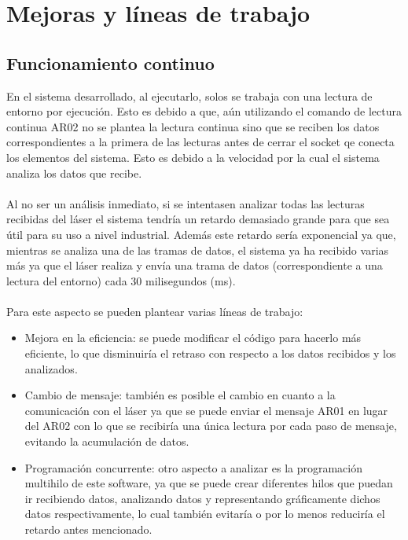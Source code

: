 \section{Mejoras y líneas de trabajo}

\subsection{Funcionamiento continuo}
En el sistema desarrollado, al ejecutarlo, solos se trabaja con una lectura de entorno por ejecución. Esto es debido a que, aún utilizando el comando de lectura continua AR02 no se plantea la lectura continua sino que se reciben los datos correspondientes a la primera de las lecturas antes de cerrar el socket qe conecta los elementos del sistema. Esto es debido a la velocidad por la cual el sistema analiza los datos que recibe.\\
\\
Al no ser un análisis inmediato, si se intentasen analizar todas las lecturas recibidas del láser el sistema tendría un retardo demasiado grande para que sea útil para su uso a nivel industrial. Además este retardo sería exponencial ya que, mientras se analiza una de las tramas de datos, el sistema ya ha recibido varias más ya que el láser realiza y envía una trama de datos (correspondiente a una lectura del entorno) cada 30 milisegundos (ms).\\
\\
Para este aspecto se pueden plantear varias líneas de trabajo:
\begin{itemize}
	\item Mejora en la eficiencia: se puede modificar el código para hacerlo más eficiente, lo que disminuiría el retraso con respecto a los datos recibidos y los analizados.
	\item Cambio de mensaje: también es posible el cambio en cuanto a la comunicación con el láser ya que se puede enviar el mensaje AR01 en lugar del AR02 con lo que se recibiría una única lectura por cada paso de mensaje, evitando la acumulación de datos.
	\item Programación concurrente: otro aspecto a analizar es la programación multihilo de este software, ya que se puede crear diferentes hilos que puedan ir recibiendo datos, analizando datos y representando gráficamente dichos datos respectivamente, lo cual también evitaría o por lo menos reduciría el retardo antes mencionado.
\end{itemize}

